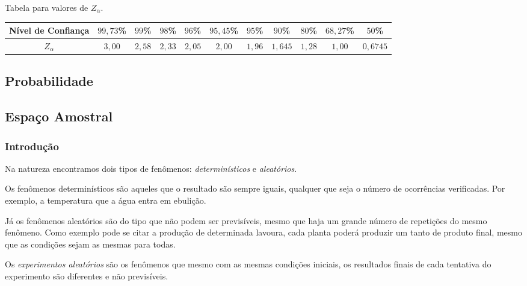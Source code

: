 \documentclass[oneside,a4paper,12pt]{article}
\begin{document}
	\begin{snugshade}
	\end{snugshade}
	\begin{center}
		Tabela para valores de $Z_{\alpha}$.
		\begin{table}[h]
			\small
			\begin{tabular}{|c|cccccccccc|}
				\hline
				Nível de Confiança	& $99,73$\% & $99$\% & $98$\% & $96$\% & $95,45$\% & $95$\% & $90$\% & $80$\% & $68,27$\% & $50$\% \\ \hline
				$Z_{\alpha}$	& $3,00$ & $2,58$ & $2,33$ & $2,05$ & $2,00$ & $1,96$ & $1,645$ & $1,28$ & $1,00$ & $0,6745$ \\ \hline
			\end{tabular}
		\end{table}
	\end{center}
	\begin{snugshade}
	\end{snugshade}
	
	
	\begin{snugshade}
		\section{Probabilidade}
	\end{snugshade}

\subsection{Espaço Amostral}

\subsubsection{Introdução}

	 Na natureza encontramos dois tipos de fenômenos: {\it determinísticos} e {\it aleatórios}.

 Os fenômenos determinísticos são aqueles que o resultado são sempre iguais, qualquer que seja o número de ocorrências verificadas. Por exemplo, a temperatura que a água entra em ebulição.

 Já os fenômenos aleatórios são do tipo que não podem ser previsíveis, mesmo que haja um grande número de repetições do mesmo fenômeno. Como exemplo pode se citar a produção de determinada lavoura, cada planta poderá produzir um tanto de produto final, mesmo que as condições sejam as mesmas para todas.

 Os {\it experimentos aleatórios} são os fenômenos que mesmo com as mesmas condições iniciais, os resultados finais de cada tentativa do experimento são diferentes e não previsíveis.
\end{document}
